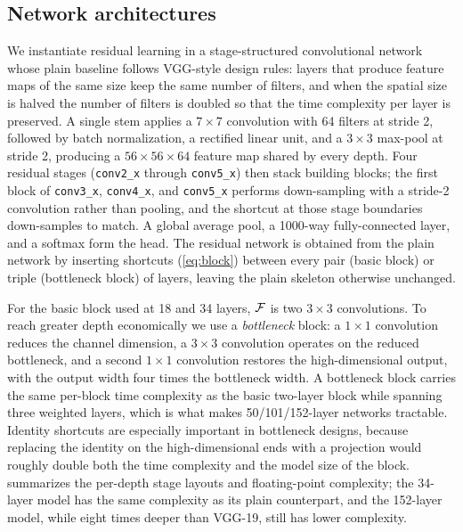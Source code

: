 \subsection{Network architectures}
\label{sec:method:arch}
We instantiate residual learning in a stage-structured convolutional network whose plain
baseline follows VGG-style design rules: layers that produce feature maps of the same
size keep the same number of filters, and when the spatial size is halved the number of
filters is doubled so that the time complexity per layer is preserved. A single stem
applies a $7\times7$ convolution with 64 filters at stride 2, followed by batch
normalization, a rectified linear unit, and a $3\times3$ max-pool at stride 2, producing
a $56\times56\times64$ feature map shared by every depth. Four residual stages
(\texttt{conv2\_x} through \texttt{conv5\_x}) then stack building blocks; the first block
of \texttt{conv3\_x}, \texttt{conv4\_x}, and \texttt{conv5\_x} performs down-sampling
with a stride-2 convolution rather than pooling, and the shortcut at those stage
boundaries down-samples to match. A global average pool, a 1000-way fully-connected
layer, and a softmax form the head. The residual network is obtained from the plain
network by inserting shortcuts (\cref{eq:block}) between every pair (basic block) or
triple (bottleneck block) of layers, leaving the plain skeleton otherwise unchanged.

For the basic block used at 18 and 34 layers, $\mathcal{F}$ is two $3\times3$ convolutions. To
reach greater depth economically we use a \emph{bottleneck} block: a $1\times1$
convolution reduces the channel dimension, a $3\times3$ convolution operates on the
reduced bottleneck, and a second $1\times1$ convolution restores the high-dimensional
output, with the output width four times the bottleneck width. A bottleneck block carries
the same per-block time complexity as the basic two-layer block while spanning three
weighted layers, which is what makes 50/101/152-layer networks tractable. Identity
shortcuts are especially important in bottleneck designs, because replacing the identity
on the high-dimensional ends with a projection would roughly double both the time
complexity and the model size of the block.  summarizes the per-depth
stage layouts and floating-point complexity; the 34-layer model has the same complexity
as its plain counterpart, and the 152-layer model, while eight times deeper than VGG-19,
still has lower complexity.




